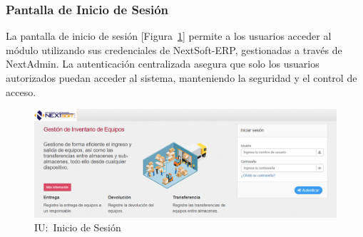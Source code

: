 \documentclass[stu, 12pt, letterpaper, donotrepeattitle, floatsintext, natbib]{apa7}
\begin{document}
\subsubsection{Pantalla de Inicio de Sesión}
La pantalla de inicio de sesión [Figura~\ref{loginProd}] permite a los usuarios acceder al módulo utilizando sus credenciales de NextSoft-ERP,
gestionadas a través de NextAdmin. La autenticación centralizada asegura que solo los usuarios autorizados puedan acceder al sistema,
manteniendo la seguridad y el control de acceso.
\begin{figure}[H]
    \centering
    \caption{IU:~Inicio de Sesión}\label{loginProd}
    \includegraphics[width=16.5cm]{./images/loginProd.png}
\end{figure}
\end{document}
